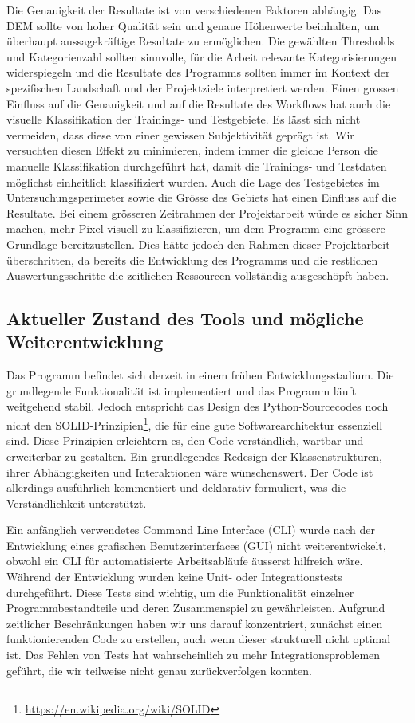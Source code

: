 \documentclass[12pt]{article}
\begin{document}
    Die Genauigkeit der Resultate ist von verschiedenen Faktoren abhängig.
    Das DEM sollte von hoher Qualität sein und genaue Höhenwerte beinhalten, um überhaupt aussagekräftige Resultate zu ermöglichen.
    Die gewählten Thresholds und Kategorienzahl sollten sinnvolle, für die Arbeit relevante Kategorisierungen widerspiegeln und die Resultate des Programms sollten immer im Kontext der spezifischen Landschaft und der Projektziele interpretiert werden.
    Einen grossen Einfluss auf die Genauigkeit und auf die Resultate des Workflows hat auch die visuelle Klassifikation der Trainings- und Testgebiete.
    Es lässt sich nicht vermeiden, dass diese von einer gewissen Subjektivität geprägt ist.
    Wir versuchten diesen Effekt zu minimieren, indem immer die gleiche Person die manuelle Klassifikation durchgeführt hat, damit die Trainings- und Testdaten möglichst einheitlich klassifiziert wurden.
    Auch die Lage des Testgebietes im Untersuchungsperimeter sowie die Grösse des Gebiets hat einen Einfluss auf die Resultate.
    Bei einem grösseren Zeitrahmen der Projektarbeit würde es sicher Sinn machen, mehr Pixel visuell zu klassifizieren, um dem Programm eine grössere Grundlage bereitzustellen.
    Dies hätte jedoch den Rahmen dieser Projektarbeit überschritten, da bereits die Entwicklung des Programms und die restlichen Auswertungsschritte die zeitlichen Ressourcen vollständig ausgeschöpft haben.

    \subsection{Aktueller Zustand des Tools und mögliche Weiterentwicklung}\label{subsec:aktueller-zustand}
        
        Das Programm befindet sich derzeit in einem frühen Entwicklungsstadium. 
        Die grundlegende Funktionalität ist implementiert und das Programm läuft weitgehend stabil. 
        Jedoch entspricht das Design des Python-Sourcecodes noch nicht den SOLID-Prinzipien\footnote{\href{https://en.wikipedia.org/wiki/SOLID}{https://en.wikipedia.org/wiki/SOLID}}, die für eine gute Softwarearchitektur essenziell sind. 
        Diese Prinzipien erleichtern es, den Code verständlich, wartbar und erweiterbar zu gestalten.
        Ein grundlegendes Redesign der Klassenstrukturen, ihrer Abhängigkeiten und Interaktionen wäre wünschenswert. 
        Der Code ist allerdings ausführlich kommentiert und deklarativ formuliert, was die Verständlichkeit unterstützt.

        Ein anfänglich verwendetes Command Line Interface (CLI) wurde nach der Entwicklung eines grafischen Benutzerinterfaces (GUI) nicht weiterentwickelt, obwohl ein CLI für automatisierte Arbeitsabläufe äusserst hilfreich wäre. 
        Während der Entwicklung wurden keine Unit- oder Integrationstests durchgeführt. 
        Diese Tests sind wichtig, um die Funktionalität einzelner Programmbestandteile und deren Zusammenspiel zu gewährleisten. 
        Aufgrund zeitlicher Beschränkungen haben wir uns darauf konzentriert, zunächst einen funktionierenden Code zu erstellen, auch wenn dieser strukturell nicht optimal ist. 
        Das Fehlen von Tests hat wahrscheinlich zu mehr Integrationsproblemen geführt, die wir teilweise nicht genau zurückverfolgen konnten.
\end{document}
